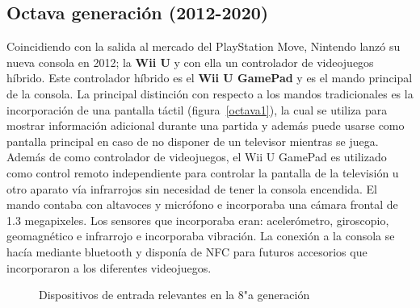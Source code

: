 
\subsection{Octava generaci\'on (2012-2020)}

Coincidiendo con la salida al mercado del PlayStation Move, Nintendo lanz\'o su nueva consola en 2012; la \textbf{Wii U} y con ella un controlador de videojuegos h\'ibrido. Este controlador h\'ibrido es el \textbf{Wii U GamePad} y es el mando principal de la consola. La principal distinci\'on con respecto a los mandos tradicionales es la incorporaci\'on de una pantalla t\'actil (figura~\ref{octava1}), la cual se utiliza para mostrar informaci\'on adicional durante una partida y adem\'as puede usarse como pantalla principal en caso de no disponer de un televisor mientras se juega. Adem\'as de como controlador de videojuegos, el Wii U GamePad es utilizado como control remoto independiente para controlar la pantalla de la televisi\'on u otro aparato v\'ia infrarrojos sin necesidad de tener la consola encendida. El mando contaba con altavoces y micr\'ofono e incorporaba una c\'amara frontal de 1.3 megapixeles. Los sensores que incorporaba eran: aceler\'ometro, giroscopio, geomagn\'etico e infrarrojo e incorporaba vibraci\'on. La conexi\'on a la consola se hac\'ia mediante bluetooth  y dispon\'ia de NFC para futuros accesorios que incorporaron a los diferentes videojuegos.\\

\begin{figure}[t]
     \hfill
{}
\hfill
{}
     \caption{Dispositivos de entrada relevantes en la 8"a  generaci\'on}
     \label{fig:octava}
   \end{figure}

